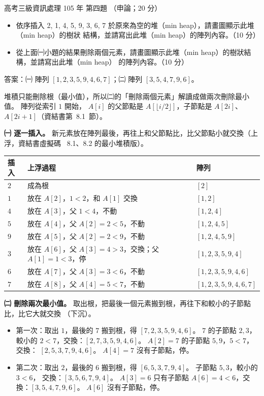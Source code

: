 \begin{pastexam}[label={px:gk3-105-ds-04}]{高考三級資訊處理 105 年 第四題}
（申論；20 分）

\begin{itemize}[leftmargin=2.2em]
\item[㈠] 依序插入 2, 1, 4, 5, 9, 3, 6, 7 於原來為空的堆（min heap），請畫圖顯示此堆（min heap）的樹狀
結構，並請寫出此堆（min heap）的陣列內容。（10 分）
\item[㈡] 從上面㈠小題的結果刪除兩個元素，請畫圖顯示此堆（min heap）的樹狀結構，並請寫出此堆（min heap）
的陣列內容。（10 分）
\end{itemize}
\end{pastexam}

\begin{pastsoln}
答案：㈠ 陣列 $[1, 2, 3, 5, 9, 4, 6, 7]$；㈡ 陣列 $[3, 5, 4, 7, 9, 6]$。

堆積只能刪除根（最小值），所以㈡的「刪除兩個元素」解讀成做兩次刪除最小值。 陣列從索引 $1$ 開始，
$A[i]$ 的父節點是 $A[\lfloor i/2 \rfloor]$，子節點是 $A[2i]$、$A[2i+1]$（資結書第~8.1~節）。

\textbf{㈠ 逐一插入。} 新元素放在陣列最後，再往上和父節點比，比父節點小就交換（上浮，資結書虛擬碼
~8.1、8.2 的最小堆積版）。
\begin{center}
\begin{tabular}{lll}
\toprule
插入 & 上浮過程 & 陣列 \\
\midrule
$2$ & 成為根 & $[2]$ \\
$1$ & 放在 $A[2]$，$1 < 2$，和 $A[1]$ 交換 & $[1, 2]$ \\
$4$ & 放在 $A[3]$，父 $1 < 4$，不動 & $[1, 2, 4]$ \\
$5$ & 放在 $A[4]$，父 $A[2] = 2 < 5$，不動 & $[1, 2, 4, 5]$ \\
$9$ & 放在 $A[5]$，父 $A[2] = 2 < 9$，不動 & $[1, 2, 4, 5, 9]$ \\
$3$ & 放在 $A[6]$，父 $A[3] = 4 > 3$，交換；父 $A[1] = 1 < 3$，停 & $[1, 2, 3, 5, 9, 4]$ \\
$6$ & 放在 $A[7]$，父 $A[3] = 3 < 6$，不動 & $[1, 2, 3, 5, 9, 4, 6]$ \\
$7$ & 放在 $A[8]$，父 $A[4] = 5 < 7$，不動 & $[1, 2, 3, 5, 9, 4, 6, 7]$ \\
\bottomrule
\end{tabular}
\end{center}

\textbf{㈡ 刪除兩次最小值。} 取出根，把最後一個元素搬到根，再往下和較小的子節點比，比它大就交換
（下沉）。
\begin{itemize}
\item 第一次：取出 $1$，最後的 $7$ 搬到根，得 $[7, 2, 3, 5, 9, 4, 6]$。 $7$ 的子節點 $2, 3$，較小的
$2 < 7$，交換：$[2, 7, 3, 5, 9, 4, 6]$。 $A[2] = 7$ 的子節點 $5, 9$，$5 < 7$，交換：
$[2, 5, 3, 7, 9, 4, 6]$。 $A[4] = 7$ 沒有子節點，停。
\item 第二次：取出 $2$，最後的 $6$ 搬到根，得 $[6, 5, 3, 7, 9, 4]$。 子節點 $5, 3$，較小的 $3 < 6$，
交換：$[3, 5, 6, 7, 9, 4]$。 $A[3] = 6$ 只有子節點 $A[6] = 4 < 6$，交換：$[3, 5, 4, 7, 9, 6]$。
$A[6]$ 沒有子節點，停。
\end{itemize}


\end{pastsoln}
